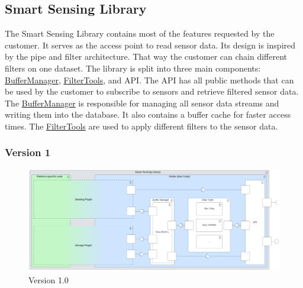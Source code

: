 \documentclass[12pt]{article}
\begin{document}
\subsection{Smart Sensing Library}
\label{sec:SmartSensingLibrary}
The Smart Sensing Library contains most of the features requested by the customer. It serves as the access point to read sensor data. Its design is inspired by the pipe and filter architecture. That way the customer can chain different filters on one dataset. The library is split into three main components: \hyperref[sec:BufferManager]{BufferManager}, \hyperref[sec:FilterTools]{FilterTools}, and API. The API has all public methods that can be used by the customer to subscribe to sensors and retrieve filtered sensor data. The \hyperref[sec:BufferManager]{BufferManager} is responsible for managing all sensor data streams and writing them into the database. It also contains a buffer cache for faster access times. The \hyperref[sec:FilterTools]{FilterTools} are used to apply different filters to the sensor data.

\subsubsection{Version 1}
\begin{figure}[ht]
\includegraphics[width=1\textwidth]{Graphics/SmartSensingLibraryOld.png}
\caption{\label{fig:bild1}Version 1.0}
\end{figure}
\end{document}
